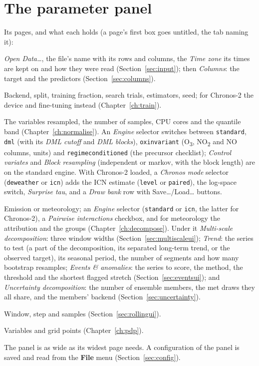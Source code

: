 \documentclass[11pt]{report}
\newcommand{\nosep}{\setlength{\itemsep}{0pt}\setlength{\parskip}{0pt}\setlength{\topsep}{2pt}}
\newcommand{\codeunderscore}{\textunderscore\allowbreak}
\newcommand{\code}[1]{\texttt{\let\_\codeunderscore #1}}
\newcommand{\tab}[1]{\textbf{#1}}
\newcommand{\NOtwo}{NO\textsubscript{2}}
\begin{document}
\section{The parameter panel}
Its pages, and what each holds (a page's first box goes untitled, the tab naming it):
\begin{description}\nosep
  \item[Data] \emph{Open Data\ldots}, the file's name with its rows and columns, the
        \emph{Time zone} its times are kept on and how they were read
        (Section~\ref{sec:input}); then \emph{Columns}: the target and the predictors
        (Section~\ref{sec:columns}).
  \item[Model] Backend, split, training fraction, search trials,
        estimators, seed; for Chronos-2 the device and fine-tuning instead
        (Chapter~\ref{ch:train}).
  \item[Normalise] The variables resampled, the number of samples, CPU cores and the
        quantile band (Chapter~\ref{ch:normalise}). An \emph{Engine} selector switches
        between \code{standard}, \code{dml} (with its \emph{DML cutoff} and
        \emph{DML blocks}), \code{ox\_invariant} (O\textsubscript{3}, \NOtwo{} and NO
        columns, units) and \code{regime\_conditioned} (the precursor checklist);
        \emph{Control variates} and \emph{Block resampling} (independent or markov,
        with the block length) are on the standard engine. With Chronos-2 loaded, a
        \emph{Chronos mode} selector (\code{deweather} or \code{icn}) adds the ICN
        estimate (\code{level} or \code{paired}), the log-space switch, \emph{Surprise
        tau}, and a \emph{Draw bank} row with Save\dots/Load\dots{} buttons.
  \item[Decompose] Emission or meteorology; an \emph{Engine} selector (\code{standard}
        or \code{icn}, the latter for Chronos-2), a \emph{Pairwise interactions}
        checkbox, and for meteorology the attribution and the groups
        (Chapter~\ref{ch:decompose}). Under it \emph{Multi-scale decomposition}:
        three window widths (Section~\ref{sec:multiscaleui}); \emph{Trend}: the
        series to test (a part of the decomposition, its separated long-term trend, or
        the observed target), its seasonal period, the number of segments and how
        many bootstrap resamples; \emph{Events \& anomalies}: the series to score,
        the method, the threshold and the shortest flagged stretch
        (Section~\ref{sec:eventsui}); and \emph{Uncertainty decomposition}: the number
        of ensemble members, the met draws they all share, and the members' backend
        (Section~\ref{sec:uncertainty}).
  \item[Rolling] Window, step and samples (Section~\ref{sec:rollingui}).
  \item[PDP] Variables and grid points (Chapter~\ref{ch:pdp}).
\end{description}
The panel is as wide as its widest page needs. A configuration of the panel is saved and
read from the \tab{File} menu (Section~\ref{sec:config}).
\end{document}
